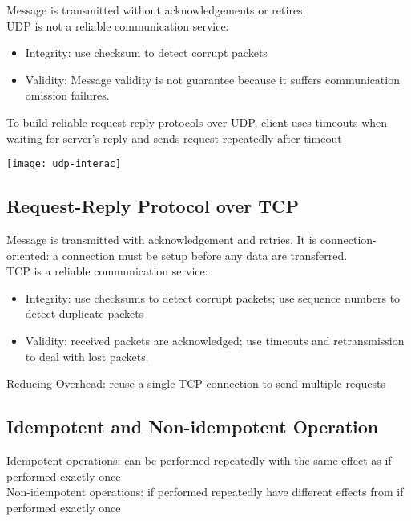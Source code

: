 \begin{multicols*}{2}
\noindent Message is transmitted without acknowledgements or retires. \\

\noindent UDP is not a reliable communication service:

\begin{itemize}
    \item Integrity: use checksum to detect corrupt packets
    \item Validity: Message validity is not guarantee because it suffers communication omission failures.
\end{itemize}

\noindent To build reliable request-reply protocols over UDP, client uses timeouts when waiting for server’s reply and sends request repeatedly after timeout

\begin{center}
\texttt{[image: udp-interac]}
\end{center}

\subsection{Request-Reply Protocol over TCP}

\noindent Message is transmitted with acknowledgement and retries. It is connection-oriented: a connection must be setup before any data are transferred.\\

\noindent TCP is a reliable communication service:

\begin{itemize}
    \item Integrity: use checksums to detect corrupt packets; use sequence numbers to detect duplicate packets
    \item Validity: received packets are acknowledged; use timeouts and retransmission to deal with lost packets.
\end{itemize}

\noindent Reducing Overhead: reuse a single TCP connection to send multiple requests

\subsection{Idempotent and Non-idempotent Operation}

\noindent Idempotent operations: can be performed repeatedly with the same effect as if performed exactly once\\

\noindent Non-idempotent operations: if performed repeatedly have different effects from if performed exactly once


\end{multicols*}
